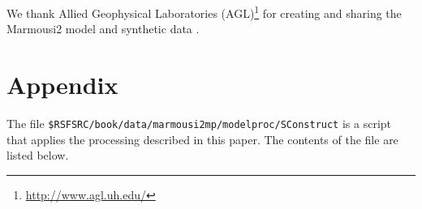 We thank Allied Geophysical Laboratories (AGL)\footnote{\url{http://www.agl.uh.edu/}} for creating and sharing the 
Marmousi2 model and synthetic data \cite[]{SEG-2002-19791982}.  

\appendix
\section{Appendix}

The file \texttt{\$RSFSRC/book/data/marmousi2mp/modelproc/SConstruct} 
is a script that applies the processing described in this paper.  The 
contents of the file are listed below.

\tiny
\lstset{language=python,numbers=left,numberstyle=\tiny,showstringspaces=false}

\normalsize







 
